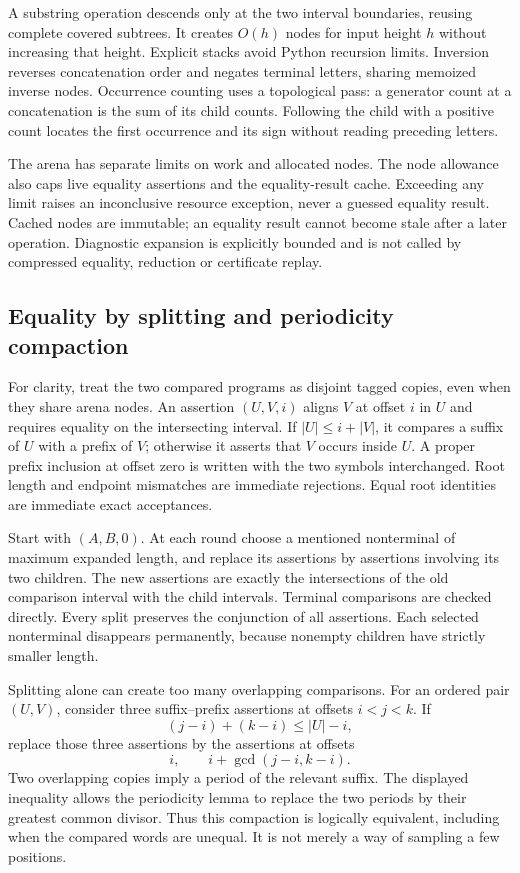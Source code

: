 A substring operation descends only at the two interval boundaries,
reusing complete covered subtrees.  It creates $O(h)$ nodes for input
height $h$ without increasing that height.  Explicit stacks avoid Python
recursion limits.  Inversion reverses concatenation order and negates
terminal letters, sharing memoized inverse nodes.  Occurrence counting
uses a topological pass: a generator count at a concatenation is the sum
of its child counts.  Following the child with a positive count locates
the first occurrence and its sign without reading preceding letters.

The arena has separate limits on work and allocated nodes.  The node
allowance also caps live equality assertions and the equality-result
cache.  Exceeding any limit raises an inconclusive resource exception,
never a guessed equality result.  Cached nodes are immutable; an equality
result cannot become stale after a later operation.  Diagnostic expansion
is explicitly bounded and is not called by compressed equality, reduction
or certificate replay.

\subsection{Equality by splitting and periodicity compaction}

For clarity, treat the two compared programs as disjoint tagged copies,
even when they share arena nodes.  An assertion $(U,V,i)$ aligns $V$ at
offset $i$ in $U$ and requires equality on the intersecting interval.
If $|U|\le i+|V|$, it compares a suffix of $U$ with a prefix of $V$;
otherwise it asserts that $V$ occurs inside $U$.  A proper prefix inclusion
at offset zero is written with the two symbols interchanged.  Root
length and endpoint mismatches are immediate rejections.  Equal root
identities are immediate exact acceptances.

Start with $(A,B,0)$.  At each round choose a mentioned nonterminal of
maximum expanded length, and replace its assertions by assertions involving
its two children.  The new assertions are exactly the intersections of the
old comparison interval with the child intervals.  Terminal comparisons
are checked directly.  Every split preserves the conjunction of all
assertions.  Each selected nonterminal disappears permanently, because
nonempty children have strictly smaller length.

Splitting alone can create too many overlapping comparisons.  For an
ordered pair $(U,V)$, consider three suffix--prefix assertions at offsets
$i<j<k$.  If
\[
 (j-i)+(k-i)\le |U|-i,
\]
replace those three assertions by the assertions at offsets
\[
 i,\qquad i+\gcd(j-i,k-i).
\]
Two overlapping copies imply a period of the relevant suffix.  The displayed
inequality allows the periodicity lemma to replace the two periods by their
greatest common divisor.  Thus this compaction is logically equivalent,
including when the compared words are unequal.  It is not merely a way of
sampling a few positions.

